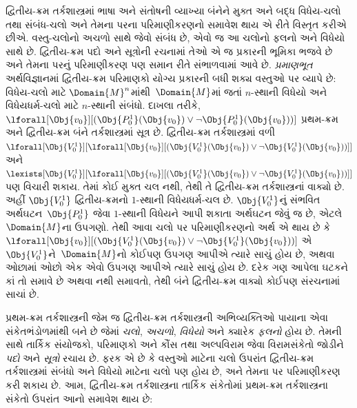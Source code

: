દ્વિતીય-ક્રમ તર્કશાસ્ત્રમાં ભાષા અને સંતોષની વ્યાખ્યા બંનેને મુક્ત અને
બદ્ધ વિધેય-ચલો તથા સંબંધ-ચલો અને તેમના પરના પરિમાણીકરણનો સમાવેશ થાય
એ રીતે વિસ્તૃત કરીએ છીએ. વસ્તુ-ચલોનો અચળો સાથે જેવો સંબંધ છે,
એવો જ આ ચલોનો ફલનો અને વિધેયો સાથે છે. દ્વિતીય-ક્રમ
પદો અને સૂત્રોની રચનામાં તેઓ એ જ પ્રકારની ભૂમિકા ભજવે છે અને
તેમના પરનું પરિમાણીકરણ પણ સમાન રીતે સંભાળવામાં આવે છે. \emph{પ્રમાણભૂત}
અર્થવિજ્ઞાનમાં દ્વિતીય-ક્રમ પરિમાણકો યોગ્ય પ્રકારની બધી શક્ય વસ્તુઓ
પર વ્યાપે છે: વિધેય-ચલો માટે $\Domain{M}^n$માંથી~$\Domain{M}$માં જતાં
$n$-સ્થાની વિધેયો અને વિધેયધર્મ-ચલો માટે $n$-સ્થાની સંબંધો.
દાખલા તરીકે,
$\lforall[\Obj{v_0}][(\Obj{P^1_0}(\Obj{v_0}) \lor \lnot
  \Obj{P^1_0}(\Obj{v_0}))]$ પ્રથમ-ક્રમ અને દ્વિતીય-ક્રમ બંને
તર્કશાસ્ત્રમાં સૂત્ર છે. દ્વિતીય-ક્રમ તર્કશાસ્ત્રમાં વળી
$\lforall[\Obj{V^1_0}][\lforall[\Obj{v_0}][(\Obj{V^1_0}(\Obj{v_0}) \lor
    \lnot \Obj{V^1_0}(\Obj{v_0}))]]$ અને
$\lexists[\Obj{V^1_0}][\lforall[\Obj{v_0}][(\Obj{V^1_0}(\Obj{v_0}) \lor
    \lnot \Obj{V^1_0}(\Obj{v_0}))]]$ પણ વિચારી શકાય. તેમાં કોઈ મુક્ત
ચલ નથી, તેથી તે દ્વિતીય-ક્રમ તર્કશાસ્ત્રનાં વાક્યો છે. અહીં
$\Obj{V^1_0}$ દ્વિતીય-ક્રમનો $1$-સ્થાની વિધેયધર્મ-ચલ છે. $\Obj{V^1_0}$નું
સંભવિત અર્થઘટન~$\Obj{P^1_0}$ જેવા $1$-સ્થાની વિધેયને આપી
શકાતા અર્થઘટન જેવું જ છે, એટલે~$\Domain{M}$ના ઉપગણો. તેથી આવા ચલો
પર પરિમાણીકરણનો અર્થ એ થાય છે કે
$\lforall[\Obj{v_0}][(\Obj{V^1_0}(\Obj{v_0}) \lor \lnot
  \Obj{V^1_0}(\Obj{v_0}))]$ એ~$\Obj{V^1_0}$ને~$\Domain{M}$નો કોઈપણ
ઉપગણ આપીએ ત્યારે સાચું હોય છે, અથવા ઓછામાં ઓછો એક એવો ઉપગણ આપીએ
ત્યારે સાચું હોય છે. દરેક ગણ આપેલા ઘટકને કાં તો સમાવે છે અથવા નથી
સમાવતો, તેથી બંને દ્વિતીય-ક્રમ વાક્યો કોઈપણ સંરચનામાં સાચાં છે.
\endgroup


\begingroup
\makeatletter{}\makeatother


\label{guunit:OLP-0325}


પ્રથમ-ક્રમ તર્કશાસ્ત્રની જેમ જ દ્વિતીય-ક્રમ તર્કશાસ્ત્રની અભિવ્યક્તિઓ
પાયાના એવા સંકેતભંડોળમાંથી બને છે જેમાં \emph{ચલો},
\emph{અચળો}, \emph{વિધેયો} અને ક્યારેક
\emph{ફલનો} હોય છે. તેમની સાથે તાર્કિક સંયોજકો, પરિમાણકો
અને કૌંસ તથા અલ્પવિરામ જેવા વિરામસંકેતો જોડીને \emph{પદો} અને
\emph{સૂત્રો} રચાય છે. ફરક એ છે કે વસ્તુઓ માટેના ચલો ઉપરાંત
દ્વિતીય-ક્રમ તર્કશાસ્ત્રમાં સંબંધો અને વિધેયો માટેના ચલો પણ હોય છે,
અને તેમના પર પરિમાણીકરણ કરી શકાય છે. આમ, દ્વિતીય-ક્રમ તર્કશાસ્ત્રના
તાર્કિક સંકેતોમાં પ્રથમ-ક્રમ તર્કશાસ્ત્રના સંકેતો ઉપરાંત આનો સમાવેશ થાય છે:

